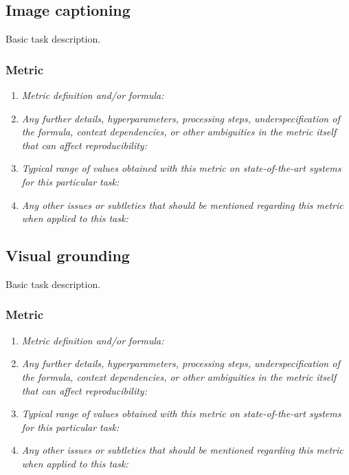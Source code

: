 \documentclass[a4paper,11pt]{article}
\begin{document}
    \subsection{Image captioning}
        Basic task description.
        \subsubsection{Metric}
            \begin{enumerate}[label=\alph*.]
                \item \textit{Metric definition and/or formula:}
                \bigskip
                \item \textit{Any further details, hyperparameters, processing steps, underspecification of the formula, context dependencies, or other ambiguities in the metric itself that can affect reproducibility:}
                \bigskip
                \item \textit{Typical range of values obtained with this metric on state-of-the-art systems for this particular task:}
                \bigskip
                \item \textit{Any other issues or subtleties that should be mentioned regarding this metric when applied to this task:}
                \bigskip
            \end{enumerate}

    \subsection{Visual grounding} \label{visual_grounding}
        Basic task description.
        \subsubsection{Metric}
            \begin{enumerate}[label=\alph*.]
                \item \textit{Metric definition and/or formula:}
                \bigskip
                \item \textit{Any further details, hyperparameters, processing steps, underspecification of the formula, context dependencies, or other ambiguities in the metric itself that can affect reproducibility:}
                \bigskip
                \item \textit{Typical range of values obtained with this metric on state-of-the-art systems for this particular task:}
                \bigskip
                \item \textit{Any other issues or subtleties that should be mentioned regarding this metric when applied to this task:}
                \bigskip
            \end{enumerate}
\end{document}
